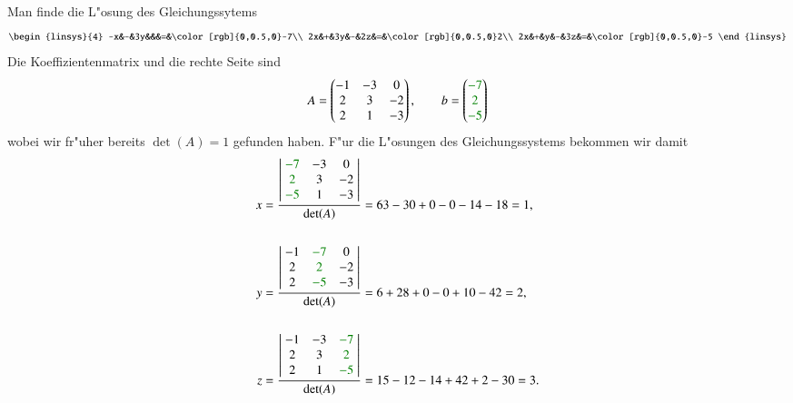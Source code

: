 \begin{beispiel}Man finde die L"osung des Gleichungssytems
\[
\begin{linsys}{4}
-x&-&3y&&&=&\color[rgb]{0,0.5,0}-7\\
2x&+&3y&-&2z&=&\color[rgb]{0,0.5,0}2\\
2x&+&y&-&3z&=&\color[rgb]{0,0.5,0}-5
\end{linsys}
\]
Die Koeffizientenmatrix und die rechte Seite sind
\[
A=\begin{pmatrix}
-1&-3&0\\
2&3&-2\\
2&1&-3
\end{pmatrix}
,\qquad
b=\begin{pmatrix}
\color[rgb]{0,0.5,0}-7\\\color[rgb]{0,0.5,0}2\\\color[rgb]{0,0.5,0}-5
\end{pmatrix}
\]
wobei wir fr"uher bereits $\det(A)=1$ gefunden haben. F"ur die L"osungen
des Gleichungssystems bekommen wir damit
\begin{align*}
x&=\frac{
\left|\;
\begin{matrix}
\color[rgb]{0,0.5,0}-7&-3&0\\
\color[rgb]{0,0.5,0}2&3&-2\\
\color[rgb]{0,0.5,0}-5&1&-3
\end{matrix}
\;\right|
}{\det(A)}
=63-30+0-0-14-18=1,
\\
\\
y&=\frac{
\left|\;
\begin{matrix}
-1&\color[rgb]{0,0.5,0}-7&0\\
2&\color[rgb]{0,0.5,0}2&-2\\
2&\color[rgb]{0,0.5,0}-5&-3
\end{matrix}
\;\right|
}{\det(A)}
=6+28+0-0+10-42=2,
\\
\\
z&=\frac{
\left|\;
\begin{matrix}
-1&-3&\color[rgb]{0,0.5,0}-7\\
2&3&\color[rgb]{0,0.5,0}2\\
2&1&\color[rgb]{0,0.5,0}-5
\end{matrix}
\;\right|
}{\det(A)}
=15-12-14+42+2-30=3.
\end{align*}
\end{beispiel}

